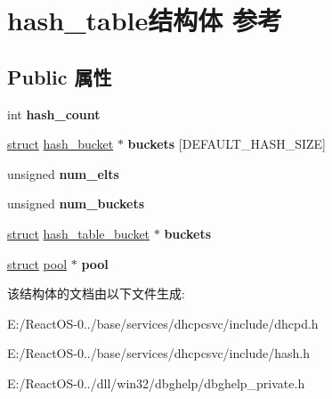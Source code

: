 \hypertarget{structhash__table}{}\section{hash\+\_\+table结构体 参考}
\label{structhash__table}
\subsection*{Public 属性}
\begin{DoxyCompactItemize}
\item 
\mbox{\label{structhash__table_a854858e2b1298b6dc0ea5225fe230eb9}} 
int {\bfseries hash\+\_\+count}
\item 
\mbox{\label{structhash__table_a02b51d6d9d0cd359999c254fba3e1ec0}} 
\hyperlink{interfacestruct}{struct} \hyperlink{structhash__bucket}{hash\+\_\+bucket} $\ast$ {\bfseries buckets} \mbox{[}D\+E\+F\+A\+U\+L\+T\+\_\+\+H\+A\+S\+H\+\_\+\+S\+I\+ZE\mbox{]}
\item 
\mbox{\label{structhash__table_a828e1102ddb3604fad11dd083db692e9}} 
unsigned {\bfseries num\+\_\+elts}
\item 
\mbox{\label{structhash__table_a8041cba05f73024e6d6ce446bdfd1034}} 
unsigned {\bfseries num\+\_\+buckets}
\item 
\mbox{\label{structhash__table_a6dc65419e283ef295011b1427bdd6cb8}} 
\hyperlink{interfacestruct}{struct} \hyperlink{structhash__table__bucket}{hash\+\_\+table\+\_\+bucket} $\ast$ {\bfseries buckets}
\item 
\mbox{\label{structhash__table_a0c0230a6b33f60953992b3d3caa0fc62}} 
\hyperlink{interfacestruct}{struct} \hyperlink{structpool}{pool} $\ast$ {\bfseries pool}
\end{DoxyCompactItemize}


该结构体的文档由以下文件生成\+:\begin{DoxyCompactItemize}
\item 
E\+:/\+React\+O\+S-\/0../base/services/dhcpcsvc/include/dhcpd.\+h\item 
E\+:/\+React\+O\+S-\/0../base/services/dhcpcsvc/include/hash.\+h\item 
E\+:/\+React\+O\+S-\/0../dll/win32/dbghelp/dbghelp\+\_\+private.\+h\end{DoxyCompactItemize}
